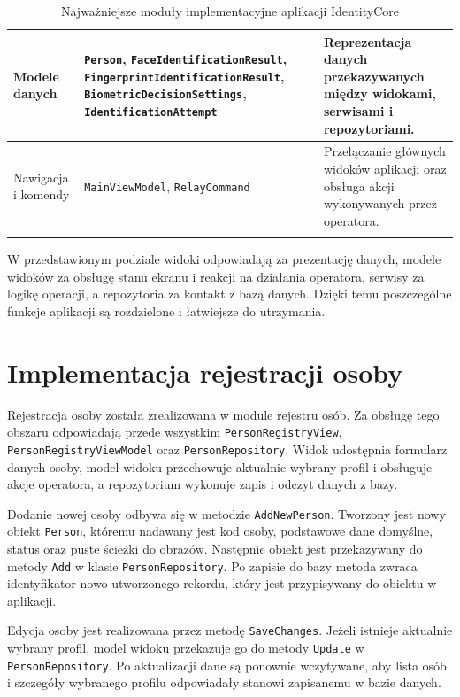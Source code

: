 \begin{xltabular}{\textwidth}{|
    >{\RaggedRight\arraybackslash}p{2.1cm}|
    >{\RaggedRight\arraybackslash}p{7.3cm}|
    >{\RaggedRight\arraybackslash}X|}
    \hline
    Modele \newline danych & \texttt{Person}, \texttt{FaceIdentificationResult}, \texttt{FingerprintIdentificationResult}, \texttt{BiometricDecisionSettings}, \texttt{IdentificationAttempt} & Reprezentacja danych przekazywanych między widokami, serwisami i repozytoriami. \\
    \hline
    Nawigacja i komendy & \texttt{MainViewModel}, \texttt{RelayCommand} & Przełączanie głównych widoków aplikacji oraz obsługa akcji wykonywanych przez operatora. \\
    \hline

    \caption{Najważniejsze moduły implementacyjne aplikacji IdentityCore}
    \label{tab:moduly-implementacyjne}
\end{xltabular}

W przedstawionym podziale widoki odpowiadają za prezentację danych, modele widoków za obsługę stanu ekranu i reakcji na działania operatora, serwisy za logikę operacji, a repozytoria za kontakt z bazą danych. Dzięki temu poszczególne funkcje aplikacji są rozdzielone i łatwiejsze do utrzymania.

\section{Implementacja rejestracji osoby}

Rejestracja osoby została zrealizowana w module rejestru osób. Za obsługę tego obszaru odpowiadają przede wszystkim \texttt{PersonRegistryView}, \texttt{PersonRegistryViewModel} oraz \texttt{PersonRepository}. Widok udostępnia formularz danych osoby, model widoku przechowuje aktualnie wybrany profil i obsługuje akcje operatora, a repozytorium wykonuje zapis i odczyt danych z bazy.

Dodanie nowej osoby odbywa się w metodzie \texttt{AddNewPerson}. Tworzony jest nowy obiekt \texttt{Person}, któremu nadawany jest kod osoby, podstawowe dane domyślne, status oraz puste ścieżki do obrazów. Następnie obiekt jest przekazywany do metody \texttt{Add} w klasie \texttt{PersonRepository}. Po zapisie do bazy metoda zwraca identyfikator nowo utworzonego rekordu, który jest przypisywany do obiektu w aplikacji.

Edycja osoby jest realizowana przez metodę \texttt{SaveChanges}. Jeżeli istnieje aktualnie wybrany profil, model widoku przekazuje go do metody \texttt{Update} w \texttt{PersonRepository}. Po aktualizacji dane są ponownie wczytywane, aby lista osób i szczegóły wybranego profilu odpowiadały stanowi zapisanemu w bazie danych.

